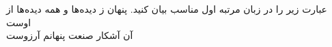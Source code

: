 عبارت زیر را در زبان مرتبه اول مناسب بیان کنید.
	پنهان ز دیده‌ها و همه دیده‌ها از اوست\\
	آن آشکار صنعت پنهانم آرزوست
	
